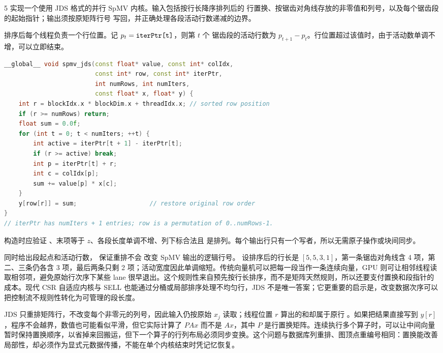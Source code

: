 \begin{solutionexercise}{5}
\problemheading 实现一个使用 JDS 格式的并行 SpMV 内核。输入包括按行长降序排列后的
行置换、按锯齿对角线存放的非零值和列号，以及每个锯齿段的起始指针；输出须按原矩阵行号
写回，并正确处理各段活动行数递减的边界。

\approachheading 排序后每个线程负责一个行位置。记 $p_t=\code{iterPtr[t]}$，则第 $t$ 个
锯齿段的活动行数为 $p_{t+1}-p_t$。行位置超过该值时，由于活动数单调不增，可以立即结束。

\answerheading
\begin{lstlisting}[language=C++]
__global__ void spmv_jds(const float* value, const int* colIdx,
                         const int* row, const int* iterPtr,
                         int numRows, int numIters,
                         const float* x, float* y) {
    int r = blockIdx.x * blockDim.x + threadIdx.x; // sorted row position
    if (r >= numRows) return;
    float sum = 0.0f;
    for (int t = 0; t < numIters; ++t) {
        int active = iterPtr[t + 1] - iterPtr[t];
        if (r >= active) break;
        int p = iterPtr[t] + r;
        int c = colIdx[p];
        sum += value[p] * x[c];
    }
    y[row[r]] = sum;                    // restore original row order
}
// iterPtr has numIters + 1 entries; row is a permutation of 0..numRows-1.
\end{lstlisting}
构造时应验证 、末项等于 $z$、各段长度单调不增、列下标合法且
 是排列。每个输出行只有一个写者，所以无需原子操作或块间同步。

\conclusionheading {} 同时给出段起点和活动行数， 保证重排不会
改变 SpMV 输出的逻辑行号。
\discussionheading
{}
设排序后的行长是 $[5,5,3,1]$，第一条锯齿对角线含 4 项，第二、三条仍各含 3 项，最后两条只剩 2 项；活动宽度因此单调缩短。传统向量机可以把每一段当作一条连续向量，GPU 则可让相邻线程读取相邻项，避免原始行次序下某些 lane 很早退出。这个规则性来自预先按行长排序，而不是矩阵天然规则，所以还要支付置换和段指针的成本。现代 CSR 自适应内核与 SELL 也能通过分桶或局部排序处理不均匀行，JDS 不是唯一答案；它更重要的启示是，改变数据次序可以把控制流不规则性转化为可管理的段长度。

JDS 只重排矩阵行，不改变每个非零元的列号，因此输入仍按原始 $x_j$ 读取；线程位置 $r$ 算出的和却属于原行 。如果把结果直接写到 $y[r]$，程序不会越界，数值也可能看似平滑，但它实际计算了 $PAx$ 而不是 $Ax$，其中 $P$ 是行置换矩阵。连续执行多个算子时，可以让中间向量暂时保持置换顺序，以省掉来回搬运，但下一个算子的行列布局必须同步变换。这个问题与数据库列重排、图顶点重编号相同：置换能改善局部性，却必须作为显式元数据传播，不能在单个内核结束时凭记忆恢复。


\end{solutionexercise}
